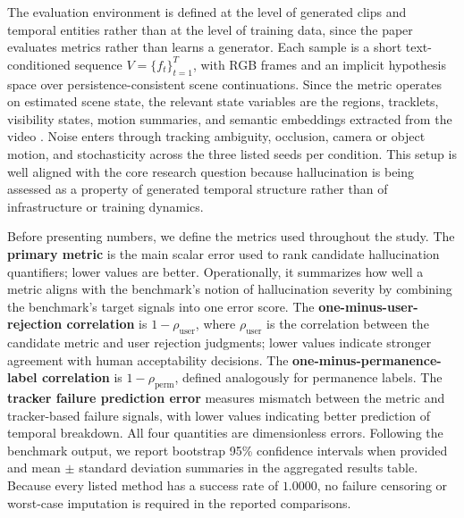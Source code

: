 \documentclass{article}
\begin{document}
The evaluation environment is defined at the level of generated clips and temporal entities rather than at the level of training data, since the paper evaluates metrics rather than learns a generator. Each sample is a short text-conditioned sequence \(V=\{f_t\}_{t=1}^T\), with RGB frames and an implicit hypothesis space over persistence-consistent scene continuations. Since the metric operates on estimated scene state, the relevant state variables are the regions, tracklets, visibility states, motion summaries, and semantic embeddings extracted from the video \cite{sam2023,xmem2022,bytetrack2022,clip2021}. Noise enters through tracking ambiguity, occlusion, camera or object motion, and stochasticity across the three listed seeds per condition. This setup is well aligned with the core research question because hallucination is being assessed as a property of generated temporal structure rather than of infrastructure or training dynamics.

Before presenting numbers, we define the metrics used throughout the study. The \textbf{primary metric} is the main scalar error used to rank candidate hallucination quantifiers; lower values are better. Operationally, it summarizes how well a metric aligns with the benchmark's notion of hallucination severity by combining the benchmark's target signals into one error score. The \textbf{one-minus-user-rejection correlation} is \(1-\rho_{\mathrm{user}}\), where \(\rho_{\mathrm{user}}\) is the correlation between the candidate metric and user rejection judgments; lower values indicate stronger agreement with human acceptability decisions. The \textbf{one-minus-permanence-label correlation} is \(1-\rho_{\mathrm{perm}}\), defined analogously for permanence labels. The \textbf{tracker failure prediction error} measures mismatch between the metric and tracker-based failure signals, with lower values indicating better prediction of temporal breakdown. All four quantities are dimensionless errors. Following the benchmark output, we report bootstrap 95\% confidence intervals when provided and mean \(\pm\) standard deviation summaries in the aggregated results table. Because every listed method has a success rate of \(1.0000\), no failure censoring or worst-case imputation is required in the reported comparisons.
\end{document}
